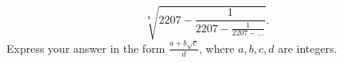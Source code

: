\[
\sqrt[8]{2207 - \frac{1}{2207-\frac{1}{2207-\dots}}}.
\]
Express your answer in the form $\frac{a+b\sqrt{c}}{d}$, where
$a,b,c,d$ are integers.
